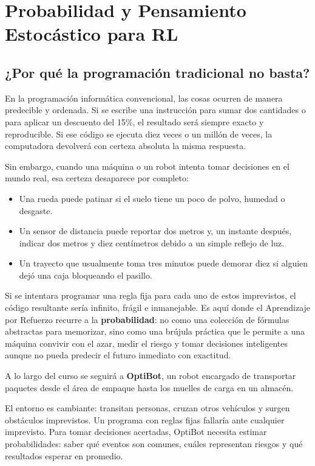 \chapter{Probabilidad y Pensamiento Estocástico para RL}
\label{cap:probabilidad}

\section{¿Por qué la programación tradicional no basta?}
En la programación informática convencional, las cosas ocurren de manera predecible y ordenada. Si se escribe una instrucción para sumar dos cantidades o para aplicar un descuento del 15\%, el resultado será siempre exacto y reproducible. Si ese código se ejecuta diez veces o un millón de veces, la computadora devolverá con certeza absoluta la misma respuesta.

Sin embargo, cuando una máquina o un robot intenta tomar decisiones en el mundo real, esa certeza desaparece por completo:
\begin{itemize}
  \item Una rueda puede patinar si el suelo tiene un poco de polvo, humedad o desgaste.
  \item Un sensor de distancia puede reportar dos metros y, un instante después, indicar dos metros y diez centímetros debido a un simple reflejo de luz.
  \item Un trayecto que usualmente toma tres minutos puede demorar diez si alguien dejó una caja bloqueando el pasillo.
\end{itemize}

Si se intentara programar una regla fija para cada uno de estos imprevistos, el código resultante sería infinito, frágil e inmanejable. Es aquí donde el Aprendizaje por Refuerzo recurre a la \textbf{probabilidad}: no como una colección de fórmulas abstractas para memorizar, sino como una brújula práctica que le permite a una máquina convivir con el azar, medir el riesgo y tomar decisiones inteligentes aunque no pueda predecir el futuro inmediato con exactitud.

\begin{optibot}
A lo largo del curso se seguirá a \textbf{OptiBot}, un robot encargado de transportar paquetes desde el área de empaque hasta los muelles de carga en un almacén.

El entorno es cambiante: transitan personas, cruzan otros vehículos y surgen obstáculos imprevistos. Un programa con reglas fijas fallaría ante cualquier imprevisto. Para tomar decisiones acertadas, OptiBot necesita estimar probabilidades: saber qué eventos son comunes, cuáles representan riesgos y qué resultados esperar en promedio.
\end{optibot}

